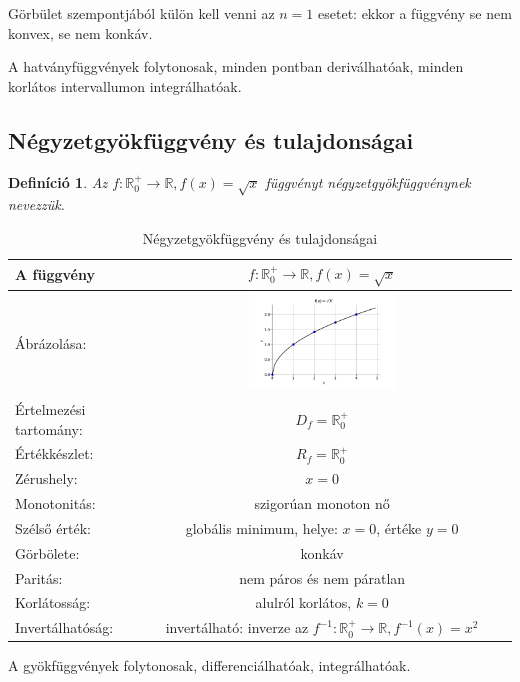 \documentclass[12pt,a4paper]{article}
\newtheorem{definition}{Definíció} [section]
\begin{document}
Görbület szempontjából külön kell venni az $n = 1$ esetet: ekkor a függvény se nem konvex, se nem konkáv.

A hatványfüggvények folytonosak, minden pontban deriválhatóak, minden korlátos intervallumon
integrálhatóak.

\newpage
\subsection{Négyzetgyökfüggvény és tulajdonságai}
\begin{definition}
Az $f:\mathbb{R}_0^+\rightarrow\mathbb{R}, f(x)=\sqrt{x}$ függvényt négyzetgyökfüggvénynek nevezzük.
\end{definition}


\begin{table}[h!]
\centering
\begin{tabular}{ | m{5cm} || c | }
A függvény & $f:\mathbb{R}_0^+\rightarrow\mathbb{R}, f(x)=\sqrt{x}$  \\
\hline
Ábrázolása: & \includegraphics[width=0.4\textwidth]{chart/2021-10-31--11:04:09}\\
\hline
Értelmezési tartomány: & $D_f=\mathbb{R}_0^+$ \\
\hline
Értékkészlet: & $R_f=\mathbb{R}_0^+$ \\
\hline
Zérushely: & $x=0$\\
\hline
Monotonitás: & szigorúan monoton nő\\
\hline
Szélső érték: & globális minimum, helye: $x=0$, értéke $y=0$\\
\hline
Görbölete: & konkáv \\
\hline
Paritás: & nem páros és nem páratlan \\
\hline
Korlátosság: & alulról korlátos, $k=0$ \\
\hline
Invertálhatóság: & invertálható: inverze az $f^{-1}:\mathbb{R}^+_0\to \mathbb{R}, f^{-1}(x)=x^2$ 
\end{tabular}
\caption{Négyzetgyökfüggvény és tulajdonságai}
\label{table:gyok_fugg}
\end{table}

A gyökfüggvények folytonosak, differenciálhatóak, integrálhatóak.
\end{document}
